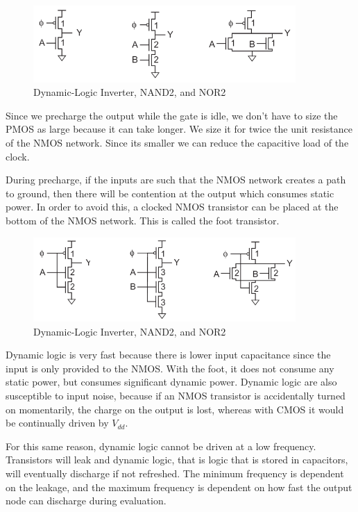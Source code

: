 \documentclass{article}
\begin{document}
\begin{figure}[ht!]
\centering
\includegraphics[width=100mm]{Unfooted.png}
\caption{Dynamic-Logic Inverter, NAND2, and NOR2}
\end{figure}

Since we precharge the output while the gate is idle, we don't have to size the PMOS as large because it can take longer. We size it for twice the unit resistance of the NMOS network. Since its smaller we can reduce the capacitive load of the clock.

During precharge, if the inputs are such that the NMOS network creates a path to ground, then there will be contention at the output which consumes static power. In order to avoid this, a clocked NMOS transistor can be placed at the bottom of the NMOS network. This is called the foot transistor.
\
\begin{figure}[ht!]
\centering
\includegraphics[width=100mm]{Footed.png}
\caption{Dynamic-Logic Inverter, NAND2, and NOR2}
\end{figure}

Dynamic logic is very fast because there is lower input capacitance since the input is only provided to the NMOS. With the foot, it does not consume any static power, but consumes significant dynamic power. Dynamic logic are also susceptible to input noise, because if an NMOS transistor is accidentally turned on momentarily, the charge on the output is lost, whereas with CMOS it would be continually driven by $V_{dd}$. 

For this same reason, dynamic logic cannot be driven at a low frequency. Transistors will leak and dynamic logic, that is logic that is stored in capacitors, will eventually discharge if not refreshed. The minimum frequency is dependent on the leakage, and the maximum frequency is dependent on how fast the output node can discharge during evaluation.
\end{document}
